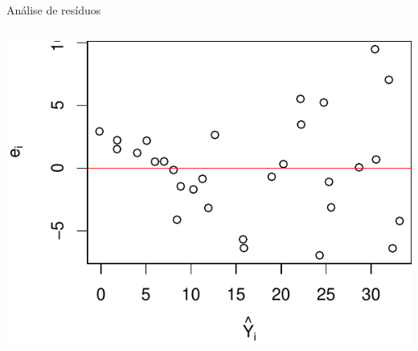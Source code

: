 \documentclass{beamer}\usepackage[]{graphicx}\usepackage[]{color}
\newenvironment{knitrout}{}{} %
\renewenvironment{knitrout}{\setlength{\topsep}{0mm}}{}
\begin{document}
\begin{frame}{Análise de resíduos}
\begin{columns}[c]
\begin{knitrout}
\includegraphics[width=1\linewidth]{figure/r6-2} 

\end{knitrout}
\end{columns}

\end{frame}
\end{document}
